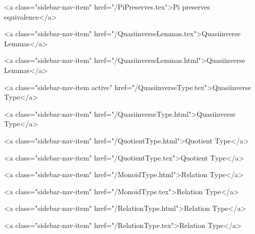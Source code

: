           <a class="sidebar-nav-item" href="/PiPreserves.tex">Pi preserves equivalence</a>
        
      
    
      
        
          <a class="sidebar-nav-item" href="/QuasiinverseLemmas.tex">Quasiinverse Lemmas</a>
        
      
    
      
        
          <a class="sidebar-nav-item" href="/QuasiinverseLemmas.html">Quasiinverse Lemmas</a>
        
      
    
      
        
          <a class="sidebar-nav-item active" href="/QuasiinverseType.tex">Quasiinverse Type</a>
        
      
    
      
        
          <a class="sidebar-nav-item" href="/QuasiinverseType.html">Quasiinverse Type</a>
        
      
    
      
        
          <a class="sidebar-nav-item" href="/QuotientType.html">Quotient Type</a>
        
      
    
      
        
          <a class="sidebar-nav-item" href="/QuotientType.tex">Quotient Type</a>
        
      
    
      
        
          <a class="sidebar-nav-item" href="/MonoidType.html">Relation Type</a>
        
      
    
      
        
          <a class="sidebar-nav-item" href="/MonoidType.tex">Relation Type</a>
        
      
    
      
        
          <a class="sidebar-nav-item" href="/RelationType.html">Relation Type</a>
        
      
    
      
        
          <a class="sidebar-nav-item" href="/RelationType.tex">Relation Type</a>
        
      
    
